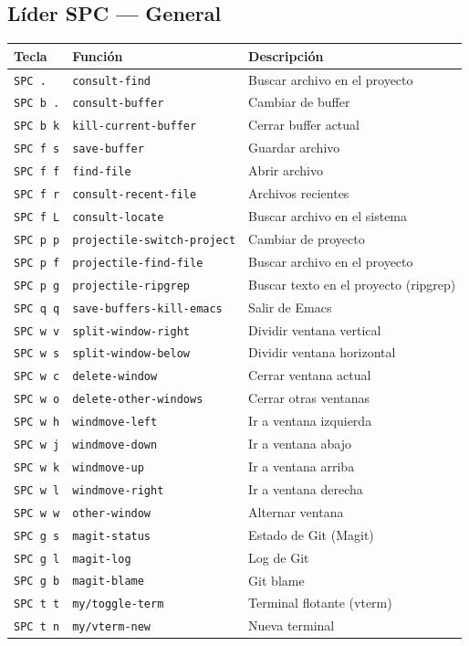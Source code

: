 \documentclass[11pt]{article}
\begin{document}
\subsection{Líder SPC — General}
\label{sec:org1d32ac2}
\begin{center}
\begin{tabular}{lll}
Tecla & Función & Descripción\\
\hline
\texttt{SPC .} & \texttt{consult-find} & Buscar archivo en el proyecto\\
\texttt{SPC b .} & \texttt{consult-buffer} & Cambiar de buffer\\
\texttt{SPC b k} & \texttt{kill-current-buffer} & Cerrar buffer actual\\
\texttt{SPC f s} & \texttt{save-buffer} & Guardar archivo\\
\texttt{SPC f f} & \texttt{find-file} & Abrir archivo\\
\texttt{SPC f r} & \texttt{consult-recent-file} & Archivos recientes\\
\texttt{SPC f L} & \texttt{consult-locate} & Buscar archivo en el sistema\\
\texttt{SPC p p} & \texttt{projectile-switch-project} & Cambiar de proyecto\\
\texttt{SPC p f} & \texttt{projectile-find-file} & Buscar archivo en el proyecto\\
\texttt{SPC p g} & \texttt{projectile-ripgrep} & Buscar texto en el proyecto (ripgrep)\\
\texttt{SPC q q} & \texttt{save-buffers-kill-emacs} & Salir de Emacs\\
\texttt{SPC w v} & \texttt{split-window-right} & Dividir ventana vertical\\
\texttt{SPC w s} & \texttt{split-window-below} & Dividir ventana horizontal\\
\texttt{SPC w c} & \texttt{delete-window} & Cerrar ventana actual\\
\texttt{SPC w o} & \texttt{delete-other-windows} & Cerrar otras ventanas\\
\texttt{SPC w h} & \texttt{windmove-left} & Ir a ventana izquierda\\
\texttt{SPC w j} & \texttt{windmove-down} & Ir a ventana abajo\\
\texttt{SPC w k} & \texttt{windmove-up} & Ir a ventana arriba\\
\texttt{SPC w l} & \texttt{windmove-right} & Ir a ventana derecha\\
\texttt{SPC w w} & \texttt{other-window} & Alternar ventana\\
\texttt{SPC g s} & \texttt{magit-status} & Estado de Git (Magit)\\
\texttt{SPC g l} & \texttt{magit-log} & Log de Git\\
\texttt{SPC g b} & \texttt{magit-blame} & Git blame\\
\texttt{SPC t t} & \texttt{my/toggle-term} & Terminal flotante (vterm)\\
\texttt{SPC t n} & \texttt{my/vterm-new} & Nueva terminal\\
\end{tabular}
\end{center}
\end{document}
